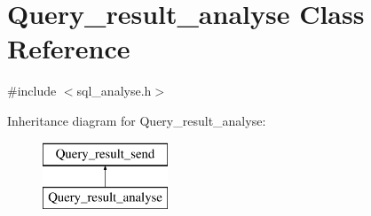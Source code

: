 \hypertarget{classQuery__result__analyse}{}\section{Query\+\_\+result\+\_\+analyse Class Reference}
\label{classQuery__result__analyse}


{\ttfamily \#include $<$sql\+\_\+analyse.\+h$>$}

Inheritance diagram for Query\+\_\+result\+\_\+analyse\+:\begin{figure}[H]
\begin{center}
\leavevmode
\includegraphics[height=2.000000cm]{classQuery__result__analyse}
\end{center}
\end{figure}
